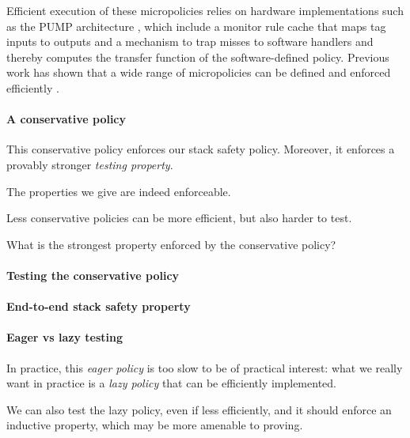 \documentclass[acmsmall,review,anonymous]{acmart}\settopmatter{printfolios=true,printccs=false,printacmref=false}
\begin{document}
Efficient execution of these micropolicies relies on hardware implementations
such as the PUMP architecture , which include a monitor rule cache that
maps tag inputs to outputs and a mechanism to trap misses to software handlers
and thereby computes the transfer function of the software-defined policy.
Previous work has shown that a wide range of micropolicies can be defined and
enforced efficiently .
%

\paragraph*{A conservative policy}

This conservative policy enforces our stack safety policy. Moreover, it enforces
a provably stronger \emph{testing property}.

The properties we give are indeed enforceable.

Less conservative policies can be more efficient, but also harder to test.

What is the strongest property enforced by the conservative policy?
%


\paragraph*{Testing the conservative policy}

\paragraph*{End-to-end stack safety property}

\paragraph*{Eager vs lazy testing}

%
In practice, this \emph{eager policy} is too slow to be of practical interest:
what we really want in practice is a \emph{lazy policy} that can be efficiently
implemented.

We can also test the lazy policy, even if less efficiently, and it should
enforce an inductive property, which may be more amenable to proving.
%
%
\end{document}
